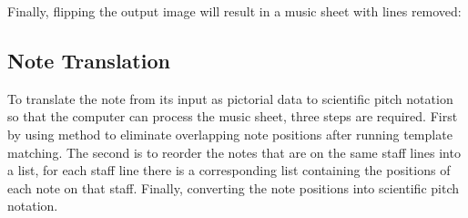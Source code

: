 \documentclass[a4paper,12pt]{report}
\begin{document}
\clearpage
Finally, flipping the output image will result in a music sheet with lines
removed:
\begin{center}
\end{center}

\clearpage

\subsection{Note Translation}
To translate the note from its input as pictorial data to scientific pitch notation so that the
computer can process the music sheet, three steps are required. First by using 
\textcite{Rosebrock} method to eliminate overlapping note positions after running template matching. The second is to
reorder the notes that are on the same staff lines into a list, for each staff line
there is a corresponding list containing the positions of each note on that staff.
Finally, converting the note positions into scientific pitch notation.
\end{document}
